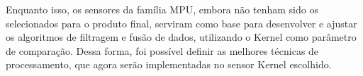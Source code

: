 \documentclass[a4paper, 12pt]{article}
\begin{document}
    Enquanto isso, os sensores da família MPU, embora não tenham sido os selecionados para o produto final, serviram como base para desenvolver e ajustar os algoritmos de filtragem e fusão de dados, utilizando o Kernel como parâmetro de comparação. Dessa forma, foi possível definir as melhores técnicas de processamento, que agora serão implementadas no sensor Kernel escolhido.

\newpage


\end{document}
